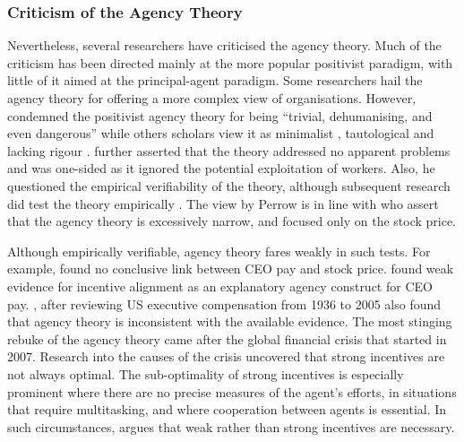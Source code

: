 \documentclass[a4paper, nobind]{templates/ociamthesis}
\begin{document}
\hypertarget{criticism-of-the-agency-theory}{%
\subsubsection{Criticism of the Agency Theory}\label{criticism-of-the-agency-theory}}

Nevertheless, several researchers have criticised the agency theory. Much of the criticism has been directed mainly at the more popular positivist paradigm, with little of it aimed at the principal-agent paradigm. Some researchers hail the agency theory for offering a more complex view of organisations. However, \textcite{perrow1986complex} condemned the positivist agency theory for being ``trivial, dehumanising, and even dangerous'' \textcite{eisenhardt1989agency} while others scholars view it as minimalist \autocite{hirsch1986collaboration}, tautological and lacking rigour \autocite{jensen1983organization}. \textcite{perrow1986complex} further asserted that the theory addressed no apparent problems and was one-sided as it ignored the potential exploitation of workers. Also, he questioned the empirical verifiability of the theory, although subsequent research did test the theory empirically \autocite{eisenhardt1989agency}. The view by Perrow is in line with \textcite{hirsch1986collaboration} who assert that the agency theory is excessively narrow, and focused only on the stock price.

Although empirically verifiable, agency theory fares weakly in such tests. For example, \textcite{jensen1990performance} found no conclusive link between CEO pay and stock price. \textcite{frydman2010ceo} found weak evidence for incentive alignment as an explanatory agency construct for CEO pay. \textcite{tosi2000much}, after reviewing US executive compensation from 1936 to 2005 also found that agency theory is inconsistent with the available evidence. The most stinging rebuke of the agency theory came after the global financial crisis that started in 2007. Research into the causes of the crisis uncovered that strong incentives are not always optimal. The sub-optimality of strong incentives is especially prominent where there are no precise measures of the agent's efforts, in situations that require multitasking, and where cooperation between agents is essential. In such circumstances,\textcite{roberts2010designing} argues that weak rather than strong incentives are necessary.
\end{document}
